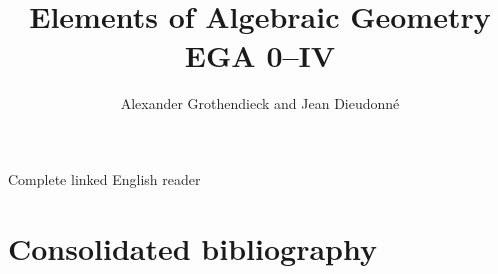


\setlength{\emergencystretch}{3em}


\newcommand{\EGAResetVolumeCounters}{%
  \setcounter{section}{0}%
  \setcounter{subsection}{0}%
  \setcounter{equation}{0}%
  \setcounter{figure}{0}%
  \setcounter{table}{0}%
  \setcounter{footnote}{0}%
}

\newcommand{\EGAVolumeTitlePage}[3]{%
  \clearpage
  \EGAResetVolumeCounters
  \phantomsection
  \label{section:#1}%
  \pdfbookmark[0]{#2: #3}{volume.#1}%
  \addcontentsline{toc}{part}{#2: #3}%
  \thispagestyle{empty}%
  \vspace*{\fill}%
  \begin{center}
    {\Huge\bfseries #2\par}
    \vspace{1.5em}
    {\LARGE #3\par}
    \vspace{2em}
    {\large Alexander Grothendieck and Jean Dieudonn\'e\par}
    \vspace{1em}
    {\large Complete English reader\par}
  \end{center}
  \vspace*{\fill}%
  \clearpage
}



\title{Elements of Algebraic Geometry\\EGA 0--IV}
\author{Alexander Grothendieck and Jean Dieudonn\'e}
\date{}
\maketitle

\label{reader:ega-global}

\begin{center}
\large Complete linked English reader
\end{center}

\tableofcontents







\clearpage
{}
{}
\section*{Consolidated bibliography}
\nocite{*}




